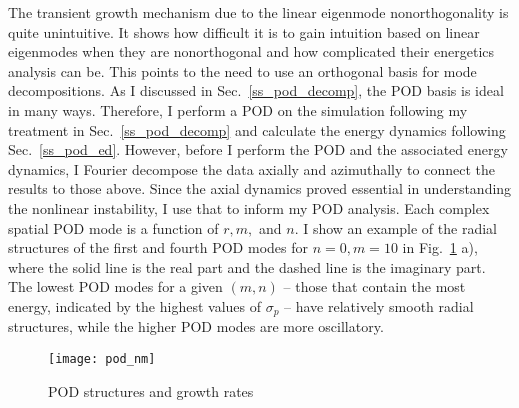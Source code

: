 The transient growth mechanism due to the linear eigenmode nonorthogonality is quite unintuitive. It shows how difficult it is to gain intuition based on linear eigenmodes when they are
nonorthogonal and how complicated their energetics analysis can be. This points to the need to use an orthogonal basis for mode decompositions. 
As I discussed in Sec.~\ref{ss_pod_decomp}, the POD basis is ideal in many ways. Therefore, I
perform a POD on the simulation following my treatment in Sec.~\ref{ss_pod_decomp} and calculate the energy dynamics following Sec.~\ref{ss_pod_ed}. However, before I perform the POD
and the associated energy dynamics, I Fourier decompose the data axially and azimuthally to connect the results to those above. Since the axial dynamics proved essential in understanding
the nonlinear instability, I use that to inform my POD analysis.
Each complex spatial POD mode is a function of $r, m,$ and $n$. I show an example of the radial structures of the first and fourth POD modes for $n=0,m=10$ in Fig.~\ref{pod_nm} a), where the solid line
is the real part and the dashed line is the imaginary part. The lowest POD modes for a given $(m,n)$ -- those that contain the most energy, indicated by the highest values of $\sigma_p$ -- 
have relatively smooth radial structures, while the higher POD modes are more oscillatory.

\begin{figure}
\centerline{\texttt{[image: pod\_nm]}}
\caption{POD structures and growth rates}
\label{pod_nm}
\end{figure}

